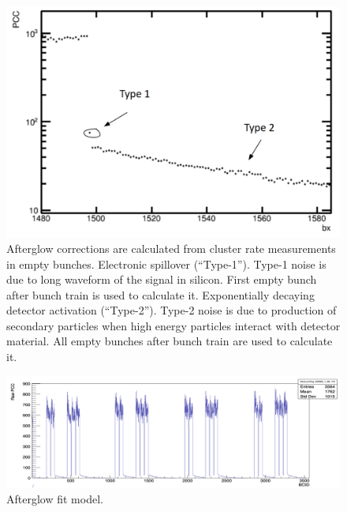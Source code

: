 \begin{figure}[!htp]
\centering
\includegraphics[width=1\textwidth]{ashish_thesis/af_t1_t2.png}
\caption[Type 1 and type 2 afterglow effect for single colliding bunch]{%
Afterglow corrections are calculated from cluster rate measurements in empty bunches. Electronic spillover (“Type-1”). Type-1 noise is due to long waveform of the signal in silicon. First empty bunch after bunch train is used to calculate it. Exponentially decaying detector activation (“Type-2”).  Type-2 noise is due to production of secondary particles when high energy particles interact with detector material. All empty bunches after bunch train are used to calculate it.
}
\label{fig:pcc_afterglow}
\end{figure}



\begin{figure}[!htp]
\centering
\includegraphics[width=1\textwidth]{ashish_thesis/fill_7036_pattern.png}
\caption[]{%
  Afterglow fit model.
}
\label{fig:af_fit}
\end{figure}


